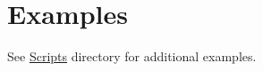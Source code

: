\section{Examples}
See \href{https://github.com/VladimirMakeev/D2ModdingToolset/tree/master/Scripts}{Scripts} directory for additional examples.

\newpage

\newpage

\newpage

\newpage

\newpage

\newpage